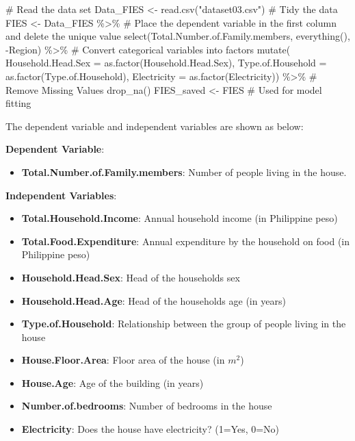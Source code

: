 \documentclass[
]{article}
\newenvironment{Shaded}{\begin{snugshade}}{\end{snugshade}}
\newcommand{\AttributeTok}[1]{\textcolor[rgb]{0.40,0.45,0.13}{#1}}
\newcommand{\CommentTok}[1]{\textcolor[rgb]{0.37,0.37,0.37}{#1}}
\newcommand{\FunctionTok}[1]{\textcolor[rgb]{0.28,0.35,0.67}{#1}}
\newcommand{\NormalTok}[1]{\textcolor[rgb]{0.00,0.23,0.31}{#1}}
\newcommand{\OtherTok}[1]{\textcolor[rgb]{0.00,0.23,0.31}{#1}}
\newcommand{\SpecialCharTok}[1]{\textcolor[rgb]{0.37,0.37,0.37}{#1}}
\newcommand{\StringTok}[1]{\textcolor[rgb]{0.13,0.47,0.30}{#1}}
\providecommand{\tightlist}{%
  \setlength{\itemsep}{0pt}\setlength{\parskip}{0pt}}\usepackage{longtable,booktabs,array}
\begin{document}
\begin{Shaded}
\begin{Highlighting}[]
\CommentTok{\# Read the data set}
\NormalTok{Data\_FIES }\OtherTok{\textless{}{-}} \FunctionTok{read.csv}\NormalTok{(}\StringTok{"dataset03.csv"}\NormalTok{)}
\CommentTok{\# Tidy the data}
\NormalTok{FIES }\OtherTok{\textless{}{-}}\NormalTok{ Data\_FIES }\SpecialCharTok{\%\textgreater{}\%}
  \CommentTok{\# Place the dependent variable in the first column and delete the unique value}
  \FunctionTok{select}\NormalTok{(Total.Number.of.Family.members, }\FunctionTok{everything}\NormalTok{(), }\SpecialCharTok{{-}}\NormalTok{Region) }\SpecialCharTok{\%\textgreater{}\%}
  \CommentTok{\# Convert categorical variables into factors}
  \FunctionTok{mutate}\NormalTok{(}
    \AttributeTok{Household.Head.Sex =} \FunctionTok{as.factor}\NormalTok{(Household.Head.Sex),}
    \AttributeTok{Type.of.Household =} \FunctionTok{as.factor}\NormalTok{(Type.of.Household),}
    \AttributeTok{Electricity =} \FunctionTok{as.factor}\NormalTok{(Electricity)) }\SpecialCharTok{\%\textgreater{}\%}
  \CommentTok{\# Remove Missing Values}
  \FunctionTok{drop\_na}\NormalTok{()}
\NormalTok{FIES\_saved }\OtherTok{\textless{}{-}}\NormalTok{ FIES }\CommentTok{\# Used for model fitting}
\end{Highlighting}
\end{Shaded}

The dependent variable and independent variables are shown as below:

\textbf{Dependent Variable}:

\begin{itemize}
\tightlist
\item
  \textbf{Total.Number.of.Family.members}: Number of people living in
  the house.
\end{itemize}

\textbf{Independent Variables}:

\begin{itemize}
\item
  \textbf{Total.Household.Income}: Annual household income (in
  Philippine peso)
\item
  \textbf{Total.Food.Expenditure}: Annual expenditure by the household
  on food (in Philippine peso)
\item
  \textbf{Household.Head.Sex}: Head of the households sex
\item
  \textbf{Household.Head.Age}: Head of the households age (in years)
\item
  \textbf{Type.of.Household}: Relationship between the group of people
  living in the house
\item
  \textbf{House.Floor.Area}: Floor area of the house (in \(m^2\))
\item
  \textbf{House.Age}: Age of the building (in years)
\item
  \textbf{Number.of.bedrooms}: Number of bedrooms in the house
\item
  \textbf{Electricity}: Does the house have electricity? (1=Yes, 0=No)
\end{itemize}
\end{document}
